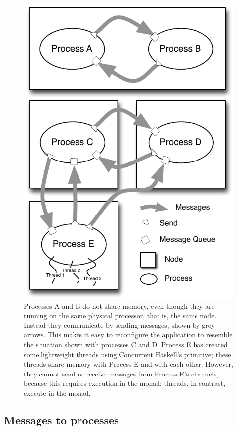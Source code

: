 \documentclass[preprint]{sigplanconf}
\begin{document}
\begin{figure}[t]
\centerline {
\includegraphics[width=0.95\columnwidth]{threadsAndProcesses}
}
\caption{ 
\label{fig:ProcessBubbles}
Processes A and B do not share memory, even though they are running on the same physical processor, that is, the same node. Instead they communicate by sending messages, shown by grey arrows.  This makes it easy to reconfigure the application to resemble the situation shown with processes C and D.  Process E has created some lightweight threads using Concurrent Haskell's  primitive; these threads share memory with Process E and with each other.  However, they cannot send or receive messages from Process E's channels, because this requires execution in the  monad; threads, in contrast, execute in the  monad.
}
\end{figure}


\subsection{Messages to processes}
\label{s:sendAndExpect}
\end{document}
